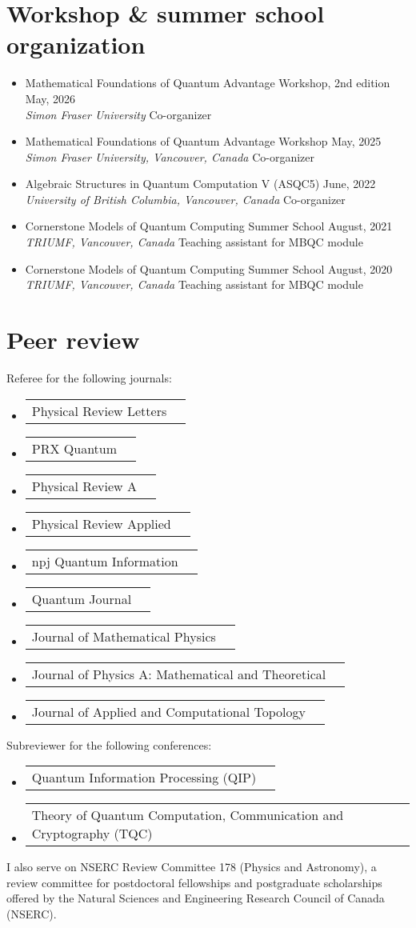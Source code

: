 \documentclass[letterpaper,11pt]{article}
\makeatletter
\newcommand{\OrganizerItem}[4]{
	\item{\parbox{0.97\textwidth}{
			{#1} \hfill {#2}\\
			\emph{#3} \hfill {#4}
		}}
}
\newcommand{\AwardsItem}[2]{
	\item{\vspace{-1pt}
		\begin{tabular*}{0.97\textwidth}{l@{\extracolsep{\fill}}r}
			{#1} & {#2}
		\end{tabular*}
		\vspace{-5pt}
	}
}
\makeatother
\begin{document}
\section*{Workshop \& summer school organization}
\begin{itemize}[leftmargin=*]
	\OrganizerItem{Mathematical Foundations of Quantum Advantage Workshop, 2nd edition}{May, 2026}{Simon Fraser University}{Co-organizer}
	\OrganizerItem{Mathematical Foundations of Quantum Advantage Workshop}{May, 2025}{Simon Fraser University, Vancouver, Canada}{Co-organizer}
	\OrganizerItem{Algebraic Structures in Quantum Computation V (ASQC5)}{June, 2022}{University of British Columbia, Vancouver, Canada}{Co-organizer}
	\OrganizerItem{Cornerstone Models of Quantum Computing Summer School}{August, 2021}{TRIUMF, Vancouver, Canada}{Teaching assistant for MBQC module}
	\OrganizerItem{Cornerstone Models of Quantum Computing Summer School}{August, 2020}{TRIUMF, Vancouver, Canada}{Teaching assistant for MBQC module}
\end{itemize}

\section*{Peer review}
Referee for the following journals:\vspace{-2mm}
\begin{itemize}[leftmargin=*]
	\AwardsItem{Physical Review Letters}{}
	\AwardsItem{PRX Quantum}{}
	\AwardsItem{Physical Review A}{}
	\AwardsItem{Physical Review Applied}{}
	\AwardsItem{npj Quantum Information}{}
	\AwardsItem{Quantum Journal}{}
	\AwardsItem{Journal of Mathematical Physics}{}
	\AwardsItem{Journal of Physics A: Mathematical and Theoretical}{}
	\AwardsItem{Journal of Applied and Computational Topology}{}
\end{itemize}
Subreviewer for the following conferences:\vspace{-2mm}
\begin{itemize}[leftmargin=*]
	\AwardsItem{Quantum Information Processing (QIP)}{}
	\AwardsItem{Theory of Quantum Computation, Communication and Cryptography (TQC)}{}
\end{itemize}

I also serve on NSERC Review Committee 178 (Physics and Astronomy), a review committee for postdoctoral fellowships and postgraduate scholarships offered by the Natural Sciences and Engineering Research Council of Canada (NSERC).
\end{document}
